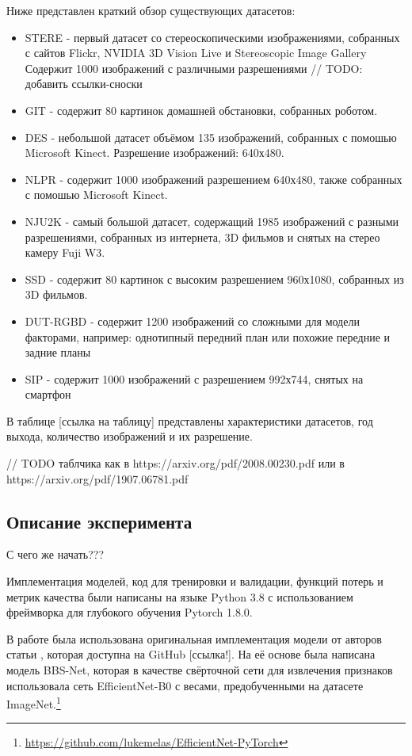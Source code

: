 Ниже представлен краткий обзор существующих датасетов:
\begin{itemize}
    \item STERE \cite{STERE} - первый датасет со стереоскопическими изображениями, собранных с сайтов Flickr, NVIDIA 3D Vision Live и Stereoscopic Image Gallery
    Содержит 1000 изображений с различными разрешениями // TODO: добавить ссылки-сноски
    \item GIT \cite{GIT} - содержит 80 картинок домашней обстановки, собранных роботом.
    \item DES \cite{DES} - небольшой датасет объёмом 135 изображений, собранных с помошью Microsoft Kinect. Разрешение изображений: 640х480.
    \item NLPR \cite{NLPR} - содержит 1000 изображений разрешением 640х480, также собранных с помошью Microsoft Kinect.
    \item NJU2K \cite{NJU2K} - самый большой датасет, содержащий 1985 изображений с разными разрешениями, собранных из интернета, 3D фильмов и снятых на стерео камеру Fuji W3.
    \item SSD \cite{SSD} - содержит 80 картинок с высоким разрешением 960х1080, собранных из 3D фильмов.
    \item DUT-RGBD \cite{DUT} - содержит 1200 изображений со сложными для модели факторами, например: однотипный передний план или похожие передние и задние планы
    \item SIP \cite{Rethinking-RGBD} - содержит 1000 изображений с разрешением 992х744, снятых на смартфон
\end{itemize}

В таблице [ссылка на таблицу] представлены характеристики датасетов, год выхода, количество изображений и их разрешение.

// TODO таблчика как в https://arxiv.org/pdf/2008.00230.pdf или в https://arxiv.org/pdf/1907.06781.pdf

\subsection{Описание эксперимента}

С чего же начать???

Имплементация моделей, код для тренировки и валидации, функций потерь и метрик качества были написаны на языке Python 3.8
с использованием фреймворка для глубокого обучения Pytorch 1.8.0\cite{Pytorch}.

В работе была использована оригинальная имплементация модели от авторов статьи \cite{BBS}, которая доступна на GitHub [ссылка!].
На её основе была написана модель BBS-Net, которая в качестве свёрточной сети для извлечения признаков
использовала сеть EfficientNet-B0 \cite{Efficientnet} с весами, предобученными на датасете ImageNet.\footnote{\url{https://github.com/lukemelas/EfficientNet-PyTorch}} 



